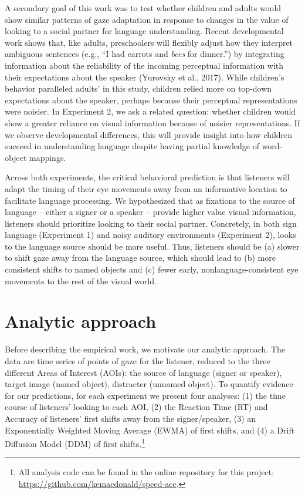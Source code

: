 \documentclass[,man,floatsintext]{apa6}
\let\rmarkdownfootnote\footnote%
\def\footnote{\protect\rmarkdownfootnote}
\begin{document}
A secondary goal of this work was to test whether children and adults would show similar patterns of gaze adaptation in response to changes in the value of looking to a social partner for language understanding. Recent developmental work shows that, like adults, preschoolers will flexibly adjust how they interpret ambiguous sentences (e.g., \enquote{I had carrots and \emph{bees} for dinner.}) by integrating information about the reliability of the incoming perceptual information with their expectations about the speaker (Yurovsky et al., 2017). While children's behavior paralleled adults' in this study, children relied more on top-down expectations about the speaker, perhaps because their perceptual representations were noisier. In Experiment 2, we ask a related question: whether children would show a greater reliance on visual information because of noisier representations. If we observe developmental differences, this will provide insight into how children succeed in understanding language despite having partial knowledge of word-object mappings.

Across both experiments, the critical behavioral prediction is that listeners will adapt the timing of their eye movements away from an informative location to facilitate language processing. We hypothesized that as fixations to the source of language -- either a signer or a speaker -- provide higher value visual information, listeners should prioritize looking to their social partner. Concretely, in both sign language (Experiment 1) and noisy auditory environments (Experiment 2), looks to the language source should be more useful. Thus, listeners should be (a) slower to shift gaze away from the language source, which should lead to (b) more consistent shifts to named objects and (c) fewer early, nonlanguage-consistent eye movements to the rest of the visual world.

\hypertarget{analytic-approach}{%
\section{Analytic approach}\label{analytic-approach}}

Before describing the empirical work, we motivate our analytic approach. The data are time series of points of gaze for the listener, reduced to the three different Areas of Interest (AOIs): the source of language (signer or speaker), target image (named object), distracter (unnamed object). To quantify evidence for our predictions, for each experiment we present four analyses: (1) the time course of listeners' looking to each AOI, (2) the Reaction Time (RT) and Accuracy of listeners' first shifts away from the signer/speaker, (3) an Exponentially Weighted Moving Average (EWMA) of first shifts, and (4) a Drift Diffusion Model (DDM) of first shifts.\footnote{All analysis code can be found in the online repository for this project: \url{https://github.com/kemacdonald/speed-acc}.}
\end{document}
